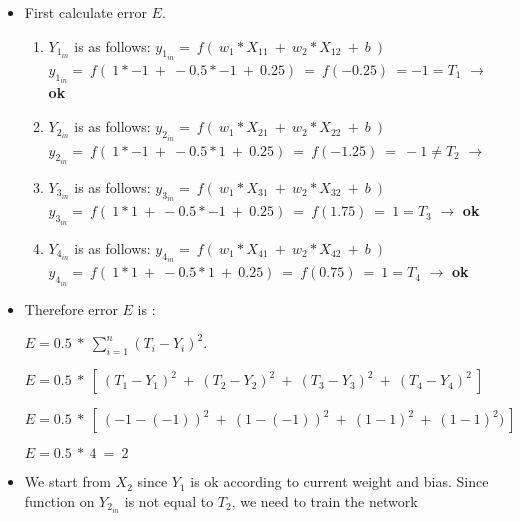 \documentclass[12pt]{article}
\begin{document}
\begin{itemize}
	\item First calculate error $E$.\BlankLine
	
		\begin{enumerate}
			
			\item $Y_{1_{in}} $ is as follows: \BlankLine
			$y_{1_{in}} =\  f (\ w_1 * X_{11} \ + \ w_2 * X_{12} \ + \ b \ )$ \BlankLine
			$y_{1_{in}} =\  f (\ 1 * -1\ + \ -0.5 * -1 \ + \ 0.25 ) \ = \ f (-0.25) \ = -1 = T_1$ $\rightarrow$ \textbf{ok}\BlankLine\BlankLine
			
			\item $Y_{2_{in}} $ is as follows: \BlankLine
			$y_{2_{in}} =\  f (\ w_1 * X_{21} \ + \ w_2 * X_{22} \ + \ b \ )$ \BlankLine
			$y_{2_{in}} =\  f (\ 1 * -1\ + \ -0.5 * 1 \ + \ 0.25 ) \ = \ f (-1.25) \ = \ -1 \neq T_2$ $\rightarrow$ \BlankLine\BlankLine
			
			\item $Y_{3_{in}} $ is as follows: \BlankLine
			$y_{3_{in}} =\  f (\ w_1 * X_{31} \ + \ w_2 * X_{32} \ + \ b \ )$ \BlankLine
			$y_{3_{in}} =\  f (\ 1 * 1\ + \ -0.5 * -1 \ + \ 0.25 ) \ = \ f (1.75) \ = \ 1 = T_3$ $\rightarrow$ \textbf{ok}\BlankLine\BlankLine
			
			\item $Y_{4_{in}} $ is as follows: \BlankLine
			$y_{4_{in}} =\  f (\ w_1 * X_{41} \ + \ w_2 * X_{42} \ + \ b \ )$ \BlankLine
			$y_{4_{in}} =\  f (\ 1 * 1\ + \ -0.5 * 1 \ + \ 0.25 ) \ = \ f (0.75) \ = \ 1 = T_4$ $\rightarrow$ \textbf{ok}\BlankLine\BlankLine
			
		\end{enumerate}
		
	\item Therefore error $ E $ is : \BlankLine\BlankLine
		
		$ E = 0.5 \ * \ \displaystyle \sum_{i=1}^{n} (T_i - Y_i)^{2} $. \BlankLine\BlankLine
		
		$ E = 0.5 \ * \ [\ (T_1 - Y_1 )^{2} \ + \ (T_2 - Y_2 )^{2} \ + \ (T_3 - Y_3 )^{2} \ + \ (T_4 - Y_4 )^{2} \ ]$\BlankLine\BlankLine
		
		$ E = 0.5 \ * \ [\ (-1 - (-1))^{2} \ + \ (1 - (-1))^{2} \ + \ (1 - 1)^{2} \ + \ (1 - 1)^{2} )\ ]$\BlankLine\BlankLine
		
		$ E = 0.5 \ * \ 4 \ = \ 2$
	
	\item We start from $X_2$ since $Y_1$ is ok according to current weight and bias. Since function on $Y_{2_{in}}$ is not equal to $T_2$, we need to train the network
	

\end{itemize}
\end{document}

